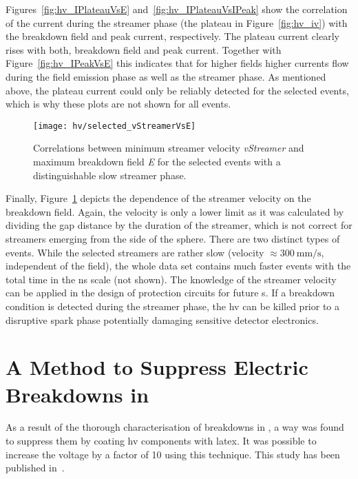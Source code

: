 Figures~\ref{fig:hv_IPlateauVsE} and~\ref{fig:hv_IPlateauVsIPeak} show the correlation of the current during the streamer phase (the plateau in Figure~\ref{fig:hv_iv}) with the breakdown field and peak current, respectively.
The plateau current clearly rises with both, breakdown field and peak current.
Together with Figure~\ref{fig:hv_IPeakVsE} this indicates that for higher fields higher currents flow during the field emission phase as well as the streamer phase.
As mentioned above, the plateau current could only be reliably detected for the selected events, which is why these plots are not shown for all events.

\begin{figure}[tbp]
	\centering
	\texttt{[image: hv/selected\_vStreamerVsE]}
	\caption[ study minimum streamer velocity versus maximum breakdown field]{%
		Correlations between minimum streamer velocity \emph{vStreamer} and maximum breakdown field \emph{E} for the selected events with a distinguishable slow streamer phase.
	}
	\label{fig:hv_vStreamerVsE}
\end{figure}

Finally, Figure~\ref{fig:hv_vStreamerVsE} depicts the dependence of the streamer velocity on the breakdown field.
Again, the velocity is only a lower limit as it was calculated by dividing the gap distance by the duration of the streamer, which is not correct for streamers emerging from the side of the sphere.
There are two distinct types of events.
While the selected streamers are rather slow (velocity $\approx \SI{300}{\milli\metre\per\second}$, independent of the field), the whole data set contains much faster events with the total time in the \si{\nano\second} scale (not shown).
The knowledge of the streamer velocity can be applied in the design of protection circuits for future \lartpc{}s.
If a breakdown condition is detected during the streamer phase, the \gls{hv} can be killed prior to a disruptive spark phase potentially damaging sensitive detector electronics.


\section{A Method to Suppress Electric Breakdowns in }
\label{sec:studies_latex}

As a result of the thorough characterisation of breakdowns in \lar{}, a way was found to suppress them by coating \gls{hv} components with latex.
It was possible to increase the voltage by a factor of \num{10} using this technique.
This study has been published in~\cite{latex}.

